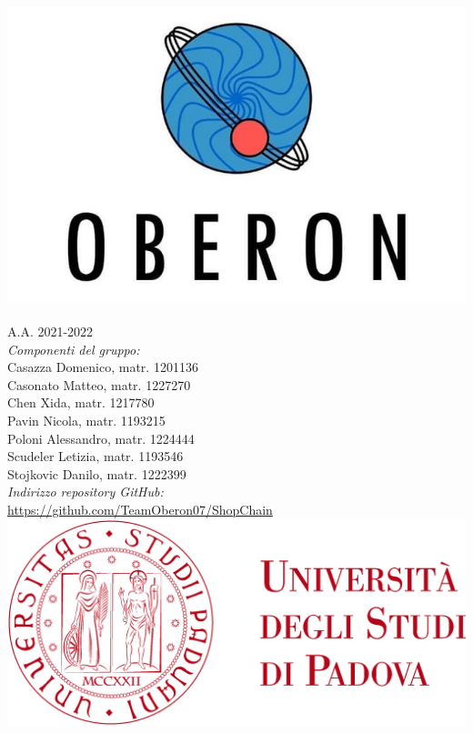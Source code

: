 \begin{titlepage}
	\begin{center}
		
		\includegraphics[scale = 0.2]{img/logo-cut.jpg}\\[1cm]
		\Huge \textsc{\doctitle{}}\\ [0.75cm]                          
		\Large \textsf{A.A. 2021-2022} \\ [1cm]

		\Large \textsl{Componenti del gruppo:} \\[0.25cm] \textsf{Casazza Domenico, matr. 1201136} \\ [0.1cm]
		\Large \textsf{Casonato Matteo, matr. 1227270} \\ [0.1cm]
		\Large \textsf{Chen Xida, matr. 1217780} \\ [0.1cm]
		\Large \textsf{Pavin Nicola, matr. 1193215} \\ [0.1cm]
		\Large \textsf{Poloni Alessandro, matr. 1224444} \\ [0.1cm]
		\Large \textsf{Scudeler Letizia, matr. 1193546} \\ [0.1cm]
		\Large \textsf{Stojkovic Danilo, matr. 1222399} \\ [1cm]
		                
		\Large \textsl{Indirizzo repository GitHub:} \\ \textsf{\href{https://github.com/TeamOberon07/ShopChain}{https://github.com/TeamOberon07/ShopChain}}\\[0.5cm]

		\includegraphics[scale = 0.055]{img/logo-unipd.png}

	\end{center}
\end{titlepage}